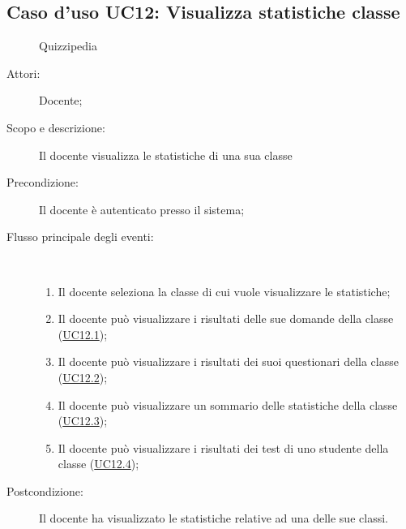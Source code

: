 \subsection{Caso d'uso UC12: Visualizza statistiche classe}
	\begin{figure}[H]
		\centering
		\begin{resizedtikzpicture}{\textwidth}
		\begin{umlsystem}[x=0, fill=lightgray!20]{Quizzipedia}
		\end{umlsystem}
		\end{resizedtikzpicture}
		\caption{}
	\end{figure}
\begin{description}
\item[Attori:] Docente;
\item[Scopo e descrizione:] Il docente visualizza le statistiche di una sua classe
      \item[Precondizione:] Il docente è autenticato presso il sistema;

        \item[Flusso principale degli eventi:] \ 
 \begin{enumerate}
          \item Il docente seleziona la classe di cui vuole visualizzare le statistiche;
          \item Il docente può visualizzare i risultati delle sue domande della classe (\hyperlink{UC12.1}{UC12.1});
          \item Il docente può visualizzare i risultati dei suoi questionari della classe (\hyperlink{UC12.2}{UC12.2});
          \item Il docente può visualizzare un sommario delle statistiche della classe (\hyperlink{UC12.3}{UC12.3});
          \item Il docente può visualizzare i risultati dei test di uno studente della classe (\hyperlink{UC12.4}{UC12.4});

      \end{enumerate}
    \item[Postcondizione:] Il docente ha visualizzato le statistiche relative ad una delle sue classi.
  \end{description}
\hypertarget{UC12.1}{}
